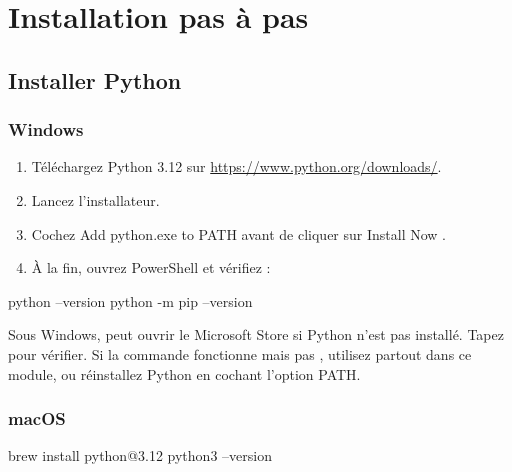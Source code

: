 \chapter{Installation pas à pas}
\label{ann:installation}


\section{Installer Python}

\subsection{Windows}

\begin{enumerate}
  \item Téléchargez Python 3.12 sur \url{https://www.python.org/downloads/}.
  \item Lancez l'installateur.
  \item Cochez \og Add python.exe to PATH \fg{} avant de cliquer sur
        \og Install Now \fg.
  \item À la fin, ouvrez PowerShell et vérifiez :
\end{enumerate}

\begin{terminal}
python --version
python -m pip --version
\end{terminal}

\begin{attention}
Sous Windows,  peut ouvrir le Microsoft Store si Python n'est pas
installé. Tapez  pour vérifier. Si la commande 
fonctionne mais pas , utilisez  partout dans ce module, ou
réinstallez Python en cochant l'option PATH.
\end{attention}

\subsection{macOS}

\begin{terminal}
brew install python@3.12
python3 --version
\end{terminal}

